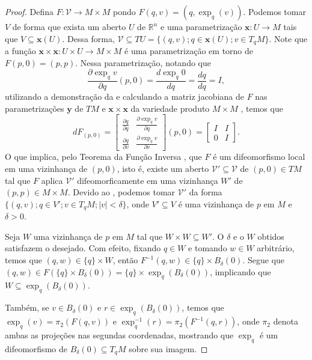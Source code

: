\begin{lemma}
\begin{proof}
        Defina $F:\mathcal{V}\to M\times M$ pondo $F(q,v)=(q,\exp_{q}(v))$. Podemos tomar $V$ de forma que exista um aberto $U$ de $\mathbb{R}^{n}$ e uma parametrização $\mathbf{x}:U\to M$ tais que $V\subseteq \mathbf{x}(U)$. Dessa forma, $\mathcal{V}\subseteq TU=\{ (q,v); q \in \mathbf{x}(U); v \in T_{q}M \}$.
        Note que a função $\mathbf{x}\times \mathbf{x}:U\times U\to M\times M$ é uma parametrização em torno de $F(p,0)=(p,p)$.
        Nessa parametrização, notando que
        \begin{equation*}
            \frac{\partial \exp_{q}v}{\partial q}(p,0)=\frac{d\exp_{q}0}{dq}=\frac{dq}{dq}=I,
        \end{equation*}
        utilizando a demonstração da  e calculando a matriz jacobiana de $F$ nas parametrizações $\mathbf{y}$ de $TM$ e $\mathbf{x}\times\mathbf{x}$ da variedade produto $M\times M$ \parencite[p.~34, exercício~1; p.~9, prop.~2.7]{doCarmo1992}, temos que
        \begin{equation*}
            dF_{(p,0)}=
            \begin{bmatrix}
                \frac{\partial q}{\partial q} & \frac{\partial \exp_{q}v}{\partial q} \\
                \frac{\partial q}{\partial v} & \frac{\partial \exp_{q}v}{\partial v}
            \end{bmatrix} (p,0) =
            \begin{bmatrix}
                I & I \\
                0 & I
            \end{bmatrix}.
        \end{equation*}
        O que implica, pelo Teorema da Função Inversa \parencite[p.~11, teo.~2.10]{doCarmo1992}, que $F$ é um difeomorfismo local em uma vizinhança de $(p,0)$, isto é, existe um aberto $\mathcal{V'\subseteq V}$ de $(p,0)\in TM$ tal que $F$ aplica $\mathcal{V}'$ difeomorficamente em uma vizinhança $W'$ de $(p,p)\in M\times M$. Devido ao , podemos tomar $\mathcal{V'}$ da forma $\{ (q,v); q \in V'; v \in T_{q}M; |v|<\delta \}$, onde $V'\subseteq V$ é uma vizinhança de $p$ em $M$ e $\delta>0$.

        Seja $W$ uma vizinhança de $p$ em $M$ tal que $W\times W\subseteq W'$. O $\delta$ e o $W$ obtidos satisfazem o desejado.
        Com efeito, fixando $q \in W$ e tomando $w \in W$ arbitrário, temos que $(q,w)\in \{ q \}\times W$, então $F^{-1}(q,w)\in \{ q \}\times B_{\delta}(0)$. Segue que $(q,w)\in F(\{ q \}\times B_{\delta}(0))=\{ q \}\times \exp_{q}(B_{\delta}(0))$, implicando que $W\subseteq \exp_{q}(B_{\delta}(0))$.

        Também, se $v \in B_{\delta}(0)$ e $r \in \exp_{q}(B_{\delta}(0))$, temos que $\exp_{q}(v)=\pi_{2}(F(q,v))$ e $\exp ^{-1}_{q}(r)= \pi_{2}(F^{-1}(q,r))$, onde $\pi_{2}$ denota ambas as projeções nas segundas coordenadas, mostrando que $\exp_{q}$ é um difeomorfismo de $B_{\delta}(0)\subseteq T_{q}M$ sobre sua imagem.
    \end{proof}
\end{lemma}

